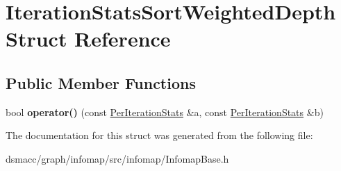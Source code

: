 \hypertarget{structIterationStatsSortWeightedDepth}{}\section{Iteration\+Stats\+Sort\+Weighted\+Depth Struct Reference}
\label{structIterationStatsSortWeightedDepth}
\subsection*{Public Member Functions}
\begin{DoxyCompactItemize}
\item 
\mbox{\label{structIterationStatsSortWeightedDepth_aefaa9637943e3cd1c3494fb75074a128}} 
bool {\bfseries operator()} (const \mbox{\hyperlink{structPerIterationStats}{Per\+Iteration\+Stats}} \&a, const \mbox{\hyperlink{structPerIterationStats}{Per\+Iteration\+Stats}} \&b)
\end{DoxyCompactItemize}


The documentation for this struct was generated from the following file\+:\begin{DoxyCompactItemize}
\item 
dsmacc/graph/infomap/src/infomap/Infomap\+Base.\+h\end{DoxyCompactItemize}

